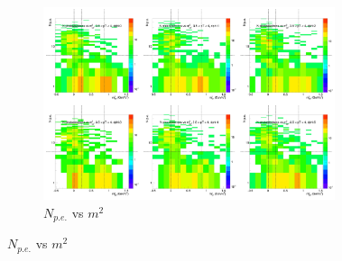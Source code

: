 \begin{figure}[H]
  \centering
    \begin{subfigure}{1\textwidth}
   \centering
   \includegraphics[width=0.94\textwidth]{hiptfits/pos/PSaccthreshold_cent0_ich1_accfire0_ptbin13.jpg}
    \caption{$N_{p.e.}$ vs $m^2$}
    \end{subfigure}
\end{figure}
